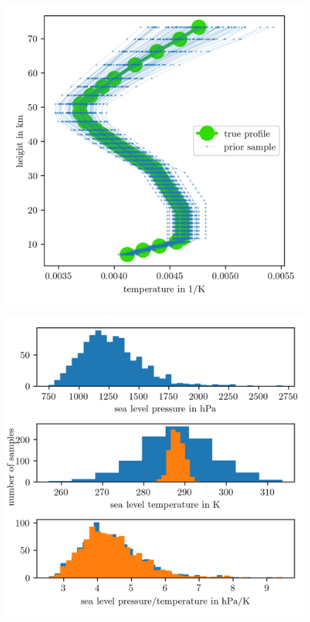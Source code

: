 \begin{figure}[ht!]
	\centering
	\includegraphics{PriorOverTempPost.png}
	\caption[]{}
	\label{fig:OverTempPrior}
\end{figure}

\begin{figure}[ht!]
	\centering
	\includegraphics{SeaLevelHist.png}
	\caption[]{}
	\label{fig:SeaLevelHist}
\end{figure}